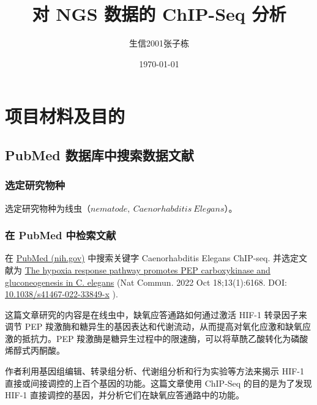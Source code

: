\documentclass[UTF8]{ctexart}
\title{对 NGS 数据的 ChIP-Seq 分析}
\author{生信2001张子栋}
\date{\today}
\begin{document}
\thispagestyle{empty}

\maketitle

\clearpage

\thispagestyle{empty}
\begin{abstract}
    
\end{abstract}
\setcounter{page}{0}

\clearpage

\thispagestyle{empty}
\tableofcontents
\setcounter{page}{0}

\clearpage

\section{项目材料及目的}

\subsection{PubMed 数据库中搜索数据文献}

\subsubsection{选定研究物种}

选定研究物种为线虫（$nematode,\ Caenorhabditis\ Elegans$）。

\subsubsection{在 PubMed 中检索文献}

在 \href{https://pubmed.ncbi.nlm.nih.gov/}{PubMed (nih.gov)} 中搜索关键字 Caenorhabditis Elegans ChIP-seq. 并选定文献为 \href{https://pubmed.ncbi.nlm.nih.gov/36257965/}{The hypoxia response pathway promotes PEP carboxykinase and gluconeogenesis in C. elegans} (Nat Commun. 2022 Oct 18;13(1):6168. DOI: \href{https://doi.org/10.1038/s41467-022-33849-x}{10.1038/s41467-022-33849-x} ).

这篇文章研究的内容是在线虫中，缺氧应答通路如何通过激活 HIF-1 转录因子来调节 PEP 羧激酶和糖异生的基因表达和代谢流动，从而提高对氧化应激和缺氧应激的抵抗力。PEP 羧激酶是糖异生过程中的限速酶，可以将草酰乙酸转化为磷酸烯醇式丙酮酸。

作者利用基因组编辑、转录组分析、代谢组分析和行为实验等方法来揭示 HIF-1 直接或间接调控的上百个基因的功能。这篇文章使用 ChIP-Seq 的目的是为了发现 HIF-1 直接调控的基因，并分析它们在缺氧应答通路中的功能。
\end{document}
